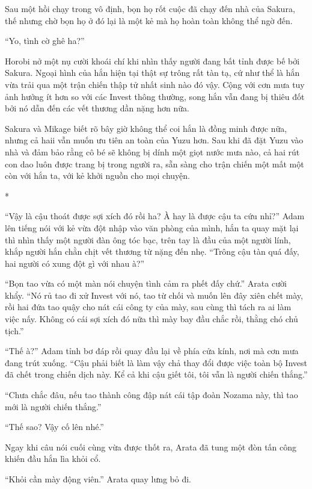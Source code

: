 {Sau một hồi chạy trong vô định, bọn họ rốt cuộc đã chạy đến nhà của
Sakura, thế nhưng chờ bọn họ ở đó lại là một kẻ mà họ hoàn toàn không
thể ngờ đến.

``Yo, tình cờ ghê ha?''

Horobi nở một nụ cười khoái chí khi nhìn thấy người đang bất tỉnh được
bế bởi Sakura. Ngoại hình của hắn hiện tại thật sự trông rất tàn tạ, cứ
như thể là hắn vừa trải qua một trận chiến thập tử nhất sinh nào đó vậy.
Cộng với cơn mưa tuy ảnh hưởng ít hơn so với các Invest thông thường,
song hắn vẫn đang bị thiêu đốt bởi nó dẫn đến các vết thương dần nặng
hơn nữa.

Sakura và Mikage biết rõ bây giờ không thể coi hắn là đồng minh được
nữa, nhưng cả haii vẫn muốn ưu tiên an toàn của Yuzu hơn. Sau khi đã đặt
Yuzu vào nhà và đảm bảo rằng cô bé sẽ không bị dính một giọt nước mưa
nào, cả hai rút con dao luôn được trang bị trong người ra, sẵn sàng cho
trận chiến một mất một còn với hắn ta, với kẻ khởi nguồn cho mọi chuyện.

*

``Vậy là cậu thoát được sợi xích đó rồi ha? À hay là được cậu ta cứu
nhỉ?'' Adam lên tiếng nói với kẻ vừa đột nhập vào văn phòng của mình,
hắn ta quay mặt lại thì nhìn thấy một người đàn ông tóc bạc, trên tay là
đầu của một người lính, khắp người hắn chằn chịt vết thương từ nặng đến
nhẹ. ``Trông cậu tàn quá đấy, hai người có xung đột gì với nhau à?''

``Bọn tao vừa có một màn nói chuyện tình cảm ra phết đấy chứ.'' Arata
cười khẩy. ``Nó rủ tao đi xử Invest với nó, tao từ chối và muốn lên đây
xiên chết mày, rồi hai đứa tao quậy cho nát cái công ty của mày, sau
cùng thì tách ra ai làm việc nấy. Không có cái sợi xích đó nữa thì mày
bay đầu chắc rồi, thằng chó chủ tịch.''

``Thế à?'' Adam tỉnh bơ đáp rồi quay đầu lại về phía cửa kính, nơi mà
cơn mưa đang trút xuống. ``Cậu phải biết là làm vậy chả thay đổi được
việc toàn bộ Invest đã chết trong chiến dịch này. Kể cả khi cậu giết
tôi, tôi vẫn là người chiến thắng.''

``Chưa chắc đâu, nếu tao thành công đập nát cái tập đoàn Nozama này, thì
tao mới là người chiến thắng.''

``Thế sao? Vậy cố lên nhé.''

Ngay khi câu nói cuối cùng vừa được thốt ra, Arata đã tung một đòn tấn
công khiến đầu hắn lìa khỏi cổ.

``Khỏi cần mày động viên.'' Arata quay lưng bỏ đi.

}
